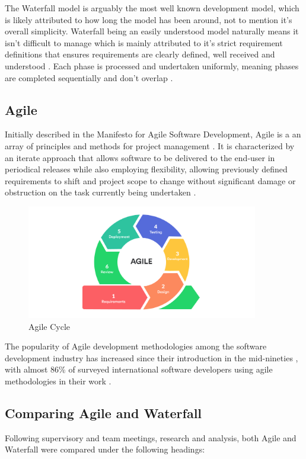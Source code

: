 The Waterfall model is arguably the most well known development model, which is likely attributed to how long the model has been around, not to mention it's overall simplicity. Waterfall being an easily understood model naturally means it isn't difficult to manage which is mainly attributed to it's strict requirement definitions that ensures requirements are clearly defined, well received and understood \cite{WATERFALL}. Each phase is processed and undertaken uniformly, meaning phases are completed sequentially and don't overlap \cite{WATERFALL_REVIEW}.

\subsection{Agile}
Initially described in the Manifesto for Agile Software Development, Agile is a an array of principles and methods for project management \cite{AGILE_MANIFESTO}. It is characterized by an iterate approach that allows software to be delivered to the end-user in periodical releases while also employing flexibility, allowing previously defined requirements to shift and project scope to change without significant damage or obstruction on the task currently being undertaken \cite{AGILE}.

\begin{figure}[H]
	\caption{Agile Cycle}
	\label{image:myImageName}
	\centering
	\includegraphics[width=0.9\textwidth]{images/agile.png}
\end{figure}	

The popularity of Agile development methodologies among the software development industry has increased since their introduction in the mid-nineties \cite{AGILE_SURVEY}, with almost 86\% of surveyed international software developers using agile methodologies in their work \cite{AGILE_SURVEY_TWO}.

\subsection{Comparing Agile and Waterfall}
Following supervisory and team meetings, research and analysis, both Agile and Waterfall were compared under the following headings:

